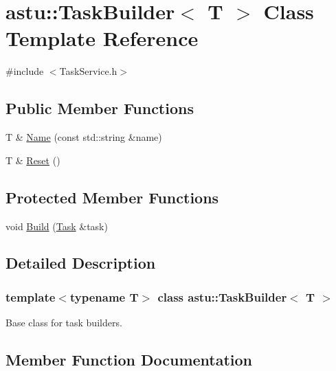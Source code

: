 \hypertarget{classastu_1_1TaskBuilder}{}\section{astu\+:\+:Task\+Builder$<$ T $>$ Class Template Reference}
\label{classastu_1_1TaskBuilder}


{\ttfamily \#include $<$Task\+Service.\+h$>$}

\subsection*{Public Member Functions}
\begin{DoxyCompactItemize}
\item 
T \& \hyperlink{classastu_1_1TaskBuilder_ab5537f6a3551aaa12378b88cbb402738}{Name} (const std\+::string \&name)
\item 
T \& \hyperlink{classastu_1_1TaskBuilder_ad55c0a226930055fce5c50e6a8ed0325}{Reset} ()
\end{DoxyCompactItemize}
\subsection*{Protected Member Functions}
\begin{DoxyCompactItemize}
\item 
void \hyperlink{classastu_1_1TaskBuilder_a4254a515845e5f751bb7ec0a5c90cde7}{Build} (\hyperlink{classastu_1_1Task}{Task} \&task)
\end{DoxyCompactItemize}


\subsection{Detailed Description}
\subsubsection*{template$<$typename T$>$\newline
class astu\+::\+Task\+Builder$<$ T $>$}

Base class for task builders. 

\subsection{Member Function Documentation}
\mbox{\label{classastu_1_1TaskBuilder_a4254a515845e5f751bb7ec0a5c90cde7}} 
